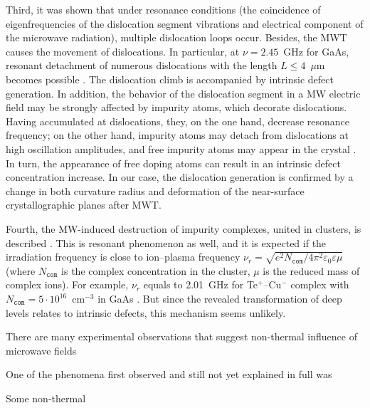 \documentclass[10pt]{iopart}
\begin{document}
Third, it was shown \cite{MWT:JLumin,Konakova2007JTFEn,Milenin:SPQEO2019} that under resonance conditions
(the coincidence of eigenfrequencies of the dislocation segment vibrations and electrical component of the microwave radiation),
multiple dislocation loops occur.
Besides, the MWT causes the  movement of dislocations.
In particular, at $\nu=2.45$~GHz for GaAs, resonant detachment 
of numerous dislocations with the length $L\leq4$~$\mu$m becomes possible \cite{Milenin:SPQEO2019}.
The dislocation climb is accompanied by intrinsic defect generation.
In addition, the behavior of the dislocation segment in a MW electric field may be strongly affected by
impurity atoms, which decorate dislocations. 
Having accumulated at dislocations, they, on the one hand,
decrease resonance frequency; 
on the other hand, impurity atoms may detach from dislocations at
high oscillation amplitudes, and free impurity atoms may appear in the crystal \cite{MWT:JLumin,Konakova2007JTFEn}.
In turn, the appearance of free doping atoms can result in an intrinsic defect concentration increase.
In our case, the dislocation generation is confirmed by a change in both curvature radius and 
deformation of the near-surface crystallographic planes after MWT.

Fourth, the MW-induced destruction of impurity complexes, united in clusters, 
is described \cite{MWT:JLumin,Konakova2007JTFEn,Milenin:SPQEO2019}.
This is resonant phenomenon as well, and it is expected if the
irradiation frequency is close to ion--plasma frequency 
$\nu_r=\sqrt{e^2N_\mathtt{com}/4\pi^2\varepsilon_0\varepsilon\mu}$
(where
$N_\mathtt{com}$ is the complex concentration in the cluster,
$\mu$ is the reduced mass of complex ions).
For example, $\nu_r$ equals to 2.01~GHz for 
Te$^+$--Cu$^-$ complex with $N_\mathtt{com}=5\cdot10^{16}$~cm$^{-3}$
in GaAs \cite{MWT:JLumin}.
But since the revealed transformation of deep levels
relates to intrinsic defects, this mechanism seems unlikely.




There are many experimental observations that suggest
non-thermal influence of microwave fields \cite{MW:Si2018,MWT:Rew2001}

One of the phenomena first observed and still not yet explained
in full was

Some non-thermal




\cite{Milenin:SPQEO2020,MW:Force,Milenin:SPQEO2019,MWT:PandForce97,MWT:PandForce92,LightNeuIrrad:1,LightNeuIrrad:2}
\end{document}
